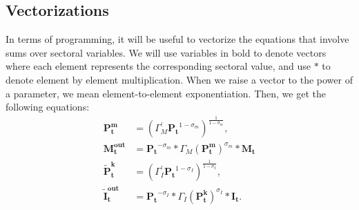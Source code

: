 \subsection{Vectorizations}

In terms of programming, it will be useful to vectorize the equations
that involve sums over sectoral variables. We will use variables in bold
to denote vectors where each element represents the corresponding sectoral
value, and use $\ast$ to denote element by element multiplication. When we raise a vector to the power of a parameter, we mean element-to-element exponentiation.
Then, we get the following equations:
\begin{align*}
\boldsymbol{P_{t}^{m}} & =\left(\Gamma_{M}^{'}\boldsymbol{P_{t}}^{1-\sigma_{m}}\right)^{\frac{{1}}{1-\sigma_{m}}},\\
\boldsymbol{M_{t}^{out}} & =\boldsymbol{P_{t}}^{-\sigma_{m}}\ast\Gamma_{M}\left(\boldsymbol{P_{t}^{m}}\right)^{\sigma_{m}}\ast\boldsymbol{M_{t}}\\
\boldsymbol{\tilde{{P}}_{t}^{k}} & =\left(\Gamma_{I}^{'}\boldsymbol{P_{t}}^{1-\sigma_{I}}\right)^{\frac{{1}}{1-\sigma_{I}}},\\
\boldsymbol{\tilde{{I}}_{t}^{out}} & =\boldsymbol{P_{t}}^{-\sigma_{I}}\ast\Gamma_{I}\left(\boldsymbol{P_{t}^{k}}\right)^{\sigma_{I}}\ast\boldsymbol{I_{t}}.
\end{align*}





